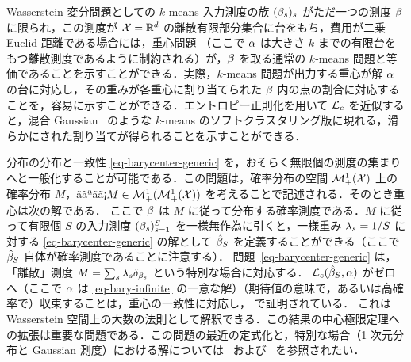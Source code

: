 \begin{rem2}{Wasserstein 変分問題としての $k$-means}\label{rem-bary-kmeans}
入力測度の族 $(\beta_s)_s$ がただ一つの測度 $\beta$ に限られ，この測度が $\mathcal{X}=\mathbb{R}^{d}$ の離散有限部分集合に台をもち，費用が二乗 Euclid 距離である場合には，重心問題
（ここで $\alpha$ は大きさ $k$ までの有限台をもつ離散測度であるように制約される）が，$\beta$ を取る通常の $k$-means 問題と等価であることを示すことができる．実際，$k$-means 問題が出力する重心が解 $\alpha$ の台に対応し，その重みが各重心に割り当てられた $\beta$ 内の点の割合に対応することを，容易に示すことができる．エントロピー正則化を用いて $\mathcal{L}_{c}$ を近似すると，混合 Gaussian~\citep{dessein2017parameter} のような $k$-means のソフトクラスタリング版に現れる，滑らかにされた割り当てが得られることを示すことができる．
\end{rem2}

\begin{rem2}{分布の分布と一致性}
	\eqref{eq-barycenter-generic} を，おそらく無限個の測度の集まりへと一般化することが可能である．この問題は，確率分布の空間 $\mathcal{M}_+^1(\mathcal{X})$ 上の確率分布 $M$，ããªãã¡$M \in \mathcal{M}_+^1(\mathcal{M}_+^1(\mathcal{X}))$ を考えることで記述される．そのとき重心は次の解である．
	ここで $\beta$ は $M$ に従って分布する確率測度である．$M$ に従って有限個 $S$ の入力測度 $(\beta_s)_{s=1}^S$ を一様無作為に引くと，一様重み $\lambda_s=1/S$ に対する \eqref{eq-barycenter-generic} の解として $\hat {\beta}_S$ を定義することができる（ここで $\hat {\beta}_S$ 自体が確率測度であることに注意する）．
	問題~\eqref{eq-barycenter-generic} は，「離散」測度 $M=\sum_s \lambda_s \delta_{\beta_s}$ という特別な場合に対応する．
	$\mathcal{L}_{c}(\hat{\beta}_S,\alpha)$ がゼロへ（ここで $\alpha$ は \eqref{eq-bary-infinite} の一意な解）（期待値の意味で，あるいは高確率で）収束することは，重心の一致性に対応し，\citep{BigotBarycenter,leGouic2016existence,bigot2012characterization} で証明されている．
	これは Wasserstein 空間上の大数の法則として解釈できる．この結果の中心極限定理への拡張は重要な問題である．この問題の最近の定式化と，特別な場合（1 次元分布と Gaussian 測度）における解については~\citep{panaretos2016amplitude} および~\citep{agueh2017vers} を参照されたい．
\end{rem2}


